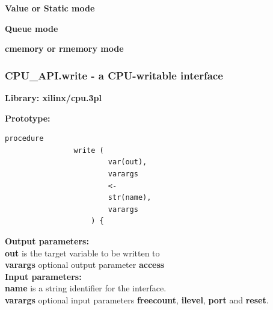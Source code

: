             
            \vspace{\baselineskip}\vspace{\baselineskip}
            {\Large \bfseries Value or Static mode}

                
                
                        


            \vspace{\baselineskip}\vspace{\baselineskip}
            {\Large \bfseries Queue mode}
                        


                
                        


            
            \vspace{\baselineskip}\vspace{\baselineskip}
            {\Large \bfseries cmemory or rmemory mode}
            
                        
                
            








        \subsubsection{CPU\_API.write - a CPU-writable interface}\label{sec:lpcpuwr}

            {\bf Library: xilinx/cpu.3pl}

            {\bf Prototype:} \\
            \vsp
            \begin{lstlisting}[gobble=12, language=threepl]
                procedure
                write (
                        var(out),
                        varargs
                        <- 
                        str(name),
                        varargs
                    ) {
            \end{lstlisting}

            {\bf Output parameters:} \\
            {\bf out} is the target variable to be written to \\
            {\bf varargs} optional output parameter {\bf access} \\

            {\bf Input parameters:} \\
            {\bf name} is a string identifier for the interface.\\
            {\bf varargs} optional input parameters {\bf freecount}, {\bf ilevel}, {\bf port}
            and {\bf reset}.\\
        
